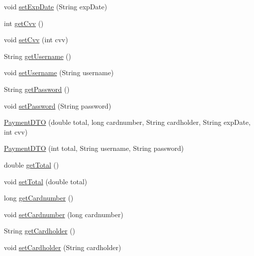 \begin{DoxyCompactItemize}
void \mbox{\hyperlink{class_s_p_q_1_1dto_1_1_payment_d_t_o_a6d3d88f07321648bc17e385432ee9044}{set\+Exp\+Date}} (String exp\+Date)
\item 
int \mbox{\hyperlink{class_s_p_q_1_1dto_1_1_payment_d_t_o_a64fb9df59333fcc2a0c8bea48024354d}{get\+Cvv}} ()
\item 
void \mbox{\hyperlink{class_s_p_q_1_1dto_1_1_payment_d_t_o_aee98ca86c3d7e05f98e387faa4f5a3d4}{set\+Cvv}} (int cvv)
\item 
String \mbox{\hyperlink{class_s_p_q_1_1dto_1_1_payment_d_t_o_a31d0edbb3ec64b406e70cd3deaa5ab1a}{get\+Username}} ()
\item 
void \mbox{\hyperlink{class_s_p_q_1_1dto_1_1_payment_d_t_o_aaad1620f8f86cb26566476c22bfcd3af}{set\+Username}} (String username)
\item 
String \mbox{\hyperlink{class_s_p_q_1_1dto_1_1_payment_d_t_o_ae012449dd0baea7f169bb64dcf973dec}{get\+Password}} ()
\item 
void \mbox{\hyperlink{class_s_p_q_1_1dto_1_1_payment_d_t_o_a51a5daa487df2578ca39ede7ae705fb6}{set\+Password}} (String password)
\item 
\mbox{\hyperlink{class_s_p_q_1_1dto_1_1_payment_d_t_o_a4a6f91d0976ce0af97a8f7f15658294c}{Payment\+D\+TO}} (double total, long cardnumber, String cardholder, String exp\+Date, int cvv)
\item 
\mbox{\hyperlink{class_s_p_q_1_1dto_1_1_payment_d_t_o_a409c1e0d8d3b7ed495177258f4eff612}{Payment\+D\+TO}} (int total, String username, String password)
\item 
double \mbox{\hyperlink{class_s_p_q_1_1dto_1_1_payment_d_t_o_a04cd2104d07971407126fcf75ef17d5b}{get\+Total}} ()
\item 
void \mbox{\hyperlink{class_s_p_q_1_1dto_1_1_payment_d_t_o_a07f242511a5b2cd45fdf771203729c1b}{set\+Total}} (double total)
\item 
long \mbox{\hyperlink{class_s_p_q_1_1dto_1_1_payment_d_t_o_ac2a8a2ab315f3027f25780a84da0b824}{get\+Cardnumber}} ()
\item 
void \mbox{\hyperlink{class_s_p_q_1_1dto_1_1_payment_d_t_o_a2b84f1e7da9d3d9966d5170ae0595839}{set\+Cardnumber}} (long cardnumber)
\item 
String \mbox{\hyperlink{class_s_p_q_1_1dto_1_1_payment_d_t_o_ac4812465bc4dd874aad6269fe8486e0b}{get\+Cardholder}} ()
\item 
void \mbox{\hyperlink{class_s_p_q_1_1dto_1_1_payment_d_t_o_a5eea0a93b97ba73b36358c6f5e0ca42e}{set\+Cardholder}} (String cardholder)
\item 

\end{DoxyCompactItemize}
